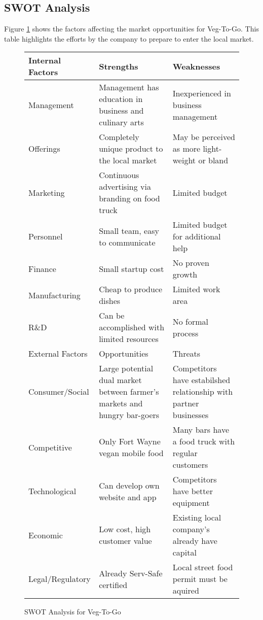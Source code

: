 \documentclass[12pt, letterpaper]{article}
\newcommand{\companyname}{Veg-To-Go}
\begin{document}
\subsection{SWOT Analysis}
Figure \ref{SWOT} shows the factors affecting the market opportunities for \companyname{}.  This table highlights the efforts by the company to prepare to enter the local market.
\singlespacing
\begin{figure}
    \caption{SWOT Analysis for \companyname{}}
    \begin{center}
        \bgroup
        \def\arraystretch{1.5}%
        \begin{tabularx}{\textwidth}{|X X X|}
            \hline
            Internal Factors & Strengths & Weaknesses\\
            \hline
            Management & Management has education in business and culinary arts & Inexperienced in business management\\
            \hline    
            Offerings & Completely unique product to the local market & May be perceived as more light-weight or bland\\
            \hline    
            Marketing & Continuous advertising via branding on food truck & Limited budget\\
            \hline    
            Personnel & Small team, easy to communicate & Limited budget for additional help\\
            \hline    
            Finance & Small startup cost & No proven growth\\
            \hline    
            Manufacturing & Cheap to produce dishes & Limited work area\\
            \hline    
            R\&D & Can be accomplished with limited resources & No formal process\\
            \hline
            \hline
            External Factors & Opportunities & Threats \\
            \hline
            Consumer/Social & Large potential dual market between farmer's markets and hungry bar-goers & Competitors have estabilshed relationship with partner businesses \\
            \hline    
            Competitive & Only Fort Wayne vegan mobile food & Many bars have a food truck with regular customers \\
            \hline    
            Technological & Can develop own website and app & Competitors have better equipment \\
            \hline    
            Economic & Low cost, high customer value & Existing local company's already have capital \\
            \hline    
            Legal/Regulatory & Already Serv-Safe certified & Local street food permit must be aquired \\
            \hline
        \end{tabularx}
        \egroup
        \label{SWOT}
    \end{center}
\end{figure}
\doublespacing
\end{document}
